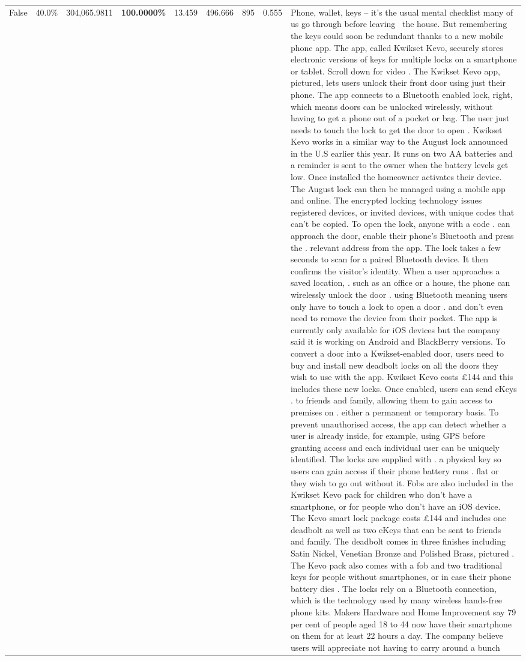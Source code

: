 \begin{table}[H]
\begin{tabular}{lllrlllll}
False & 40.0\% & 304,065.9811 & \bfseries \color{red} 100.0000\% & 13.459 & 496.666 & 895 & 0.555 & Phone, wallet, keys – it’s the usual mental checklist many of us go through before leaving  the house. But remembering the keys could soon be redundant thanks to a new mobile phone app. The app, called Kwikset Kevo, securely stores electronic versions of keys for multiple locks on a smartphone or tablet. Scroll down for video . The Kwikset Kevo app, pictured, lets users unlock their front door using just their phone. The app connects to a Bluetooth enabled lock, right, which means doors can be unlocked wirelessly, without having to get a phone out of a pocket or bag. The user just needs to touch the lock to get the door to open . Kwikset Kevo works in a similar way to the August lock announced in the U.S earlier this year. It runs on two AA batteries and a reminder is sent to the owner when the battery levels get low. Once installed the homeowner activates their device. The August lock can then be managed using a mobile app and online. The encrypted locking technology issues registered devices, or invited devices, with unique codes that can't be copied. To open the lock, anyone with a code . can approach the door, enable their phone's Bluetooth and press the . relevant address from the app. The lock takes a few seconds to scan for a paired Bluetooth device. It then confirms the visitor's identity. When a user approaches a saved location, . such as an office or a house, the phone can wirelessly unlock the door . using Bluetooth meaning users only have to touch a lock to open a door . and don't even need to remove the device from their pocket. The app is currently only available for iOS devices but the company said it is working on Android and BlackBerry versions. To convert a door into a Kwikset-enabled door, users need to buy and install new deadbolt locks on all the doors they wish to use with the app. Kwikset Kevo costs £144 and this includes these new locks. Once enabled, users can send eKeys . to friends and family, allowing them to gain access to premises on . either a permanent or temporary basis. To prevent unauthorised access, the app can detect whether a user is already inside, for example, using GPS before granting access and each individual user can be uniquely identified. The locks are supplied with . a physical key so users can gain access if their phone battery runs . flat or they wish to go out without it. Fobs are also included in the Kwikset Kevo pack for children who don't have a smartphone, or for people who don't have an iOS device. The Kevo smart lock package costs £144 and includes one deadbolt as well as two eKeys that can be sent to friends and family. The deadbolt comes in three finishes including Satin Nickel, Venetian Bronze and Polished Brass, pictured . The Kevo pack also comes with a fob and two traditional keys for people without smartphones, or in case their phone battery dies . The locks rely on a Bluetooth connection, which is the technology used by many wireless hands-free phone kits. Makers Hardware and Home Improvement say 79 per cent of people aged 18 to 44 now have their smartphone on them for at least 22 hours a day. The company believe users will appreciate not having to carry around a bunch 
\end{tabular}
\end{table}
